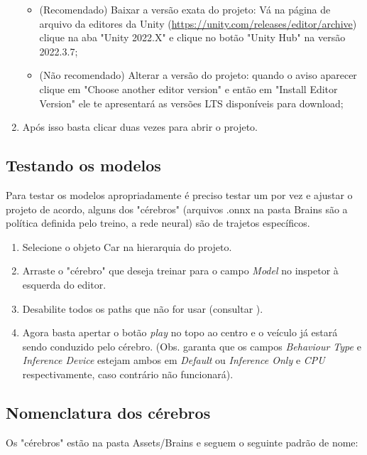 \begin{apendicesenv}
\begin{enumerate}
    \begin{itemize}
        \item (Recomendado) Baixar a versão exata do projeto: Vá na página de arquivo da editores da Unity (\href{https://unity.com/releases/editor/archive}{https://unity.com/releases/editor/archive}) clique na aba "Unity 2022.X"{} e clique no botão  "Unity Hub"{} na versão 2022.3.7;
        \item (Não recomendado) Alterar a versão do projeto: quando o aviso aparecer clique em "Choose another editor version"{} e então em "Install Editor Version"{} ele te apresentará as versões LTS disponíveis para download;
    \end{itemize}
    \item Após isso basta clicar duas vezes para abrir o projeto.
 \end{enumerate}

\subsection*{Testando os modelos}
Para testar os modelos apropriadamente é preciso testar um por vez e ajustar o projeto de acordo, alguns dos "cérebros"{} (arquivos .onnx na pasta Brains são a política definida pelo treino, a rede neural) são de trajetos específicos.

\begin{enumerate}
    \item Selecione o objeto Car na hierarquia do projeto.
    \item Arraste o "cérebro"{} que deseja treinar para o campo \textit{Model} no inspetor à esquerda do editor.
    \item Desabilite todos os paths que não for usar (consultar ).
    \item Agora basta apertar o botão \textit{play} no topo ao centro e o veículo já estará sendo conduzido pelo cérebro. (Obs. garanta que os campos \textit{Behaviour Type} e \textit{Inference Device} estejam ambos em \textit{Default}  ou  \textit{Inference Only} e \textit{CPU} respectivamente, caso contrário não funcionará).
\end{enumerate}

\subsection*{Nomenclatura dos cérebros}\label{nomenclatura}
Os "cérebros"{} estão na pasta Assets/Brains e seguem o seguinte padrão de nome:


\end{apendicesenv}
